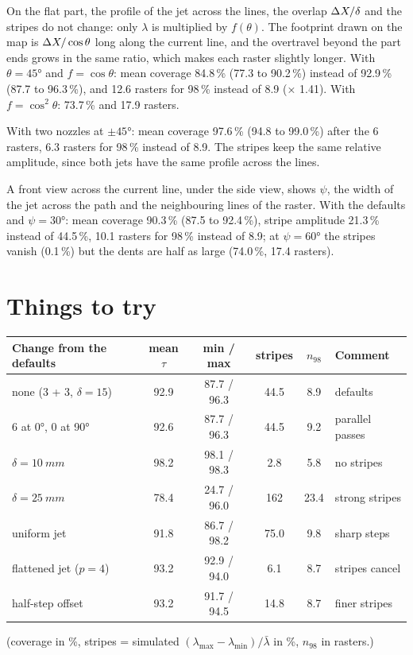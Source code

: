 \documentclass[11pt,a4paper]{article}
\begin{document}
\noindent On the flat part, the profile of the jet across the lines, the overlap $\Delta X/\delta$ and the stripes do not change: only $\lambda$ is multiplied by $f(\theta)$. The footprint drawn on the map is $\Delta X/\cos\theta$ long along the current line, and the overtravel beyond the part ends grows in the same ratio, which makes each raster slightly longer. With $\theta=45°$ and $f=\cos\theta$: mean coverage 84.8\,\% (77.3 to 90.2\,\%) instead of 92.9\,\% (87.7 to 96.3\,\%), and 12.6 rasters for 98\,\% instead of 8.9 (× 1.41). With $f=\cos^2\theta$: 73.7\,\% and 17.9 rasters.

\noindent With two nozzles at $\pm45°$: mean coverage 97.6\,\% (94.8 to 99.0\,\%) after the 6 rasters, 6.3 rasters for 98\,\% instead of 8.9. The stripes keep the same relative amplitude, since both jets have the same profile across the lines.

\noindent A front view across the current line, under the side view, shows $\psi$, the width of the jet across the path and the neighbouring lines of the raster. With the defaults and $\psi=30°$: mean coverage 90.3\,\% (87.5 to 92.4\,\%), stripe amplitude 21.3\,\% instead of 44.5\,\%, 10.1 rasters for 98\,\% instead of 8.9; at $\psi=60°$ the stripes vanish (0.1\,\%) but the dents are half as large (74.0\,\%, 17.4 rasters).

\section{Things to try}

\begin{center}
\small
\begin{tabular}{@{}lccccl@{}}
\toprule
Change from the defaults & mean $\tau$ & min / max & stripes & $n_{98}$ & Comment\\ \midrule
none (3 + 3, $\delta=15$) & 92.9 & 87.7 / 96.3 & 44.5 & 8.9 & defaults\\
6 at 0°, 0 at 90° & 92.6 & 87.7 / 96.3 & 44.5 & 9.2 & parallel passes\\
$\delta=\SI{10}{mm}$ & 98.2 & 98.1 / 98.3 & 2.8 & 5.8 & no stripes\\
$\delta=\SI{25}{mm}$ & 78.4 & 24.7 / 96.0 & 162 & 23.4 & strong stripes\\
uniform jet & 91.8 & 86.7 / 98.2 & 75.0 & 9.8 & sharp steps\\
flattened jet ($p=4$) & 93.2 & 92.9 / 94.0 & 6.1 & 8.7 & stripes cancel\\
half-step offset & 93.2 & 91.7 / 94.5 & 14.8 & 8.7 & finer stripes\\ \bottomrule
\end{tabular}
\end{center}
\noindent (coverage in \%, stripes = simulated $(\lambda_{\max}-\lambda_{\min})/\bar\lambda$ in \%, $n_{98}$ in rasters.)
\end{document}
